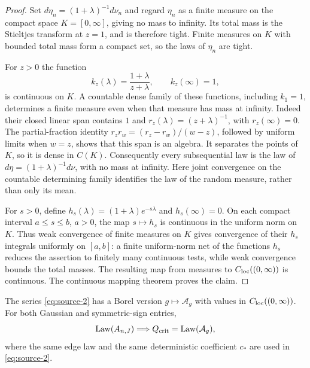 \begin{proof}
Set $d\eta_n=(1+\lambda)^{-1}d\nu_n$ and regard $\eta_n$ as a finite
measure on the compact space $K=[0,\infty]$, giving no mass to infinity.
Its total mass is the Stieltjes transform at $z=1$, and is therefore
tight.  Finite measures on $K$ with bounded total mass form a compact
set, so the laws of $\eta_n$ are tight.

For $z>0$ the function
\[
 k_z(\lambda)=\frac{1+\lambda}{z+\lambda},\qquad k_z(\infty)=1,
\]
is continuous on $K$.  A countable dense family of these functions,
including $k_1=1$, determines a finite measure even when that measure
has mass at infinity.  Indeed their closed linear span contains
$1$ and $r_z(\lambda)=(z+\lambda)^{-1}$, with $r_z(\infty)=0$.
The partial-fraction identity
$r_zr_w=(r_z-r_w)/(w-z)$, followed by uniform limits when $w=z$,
shows that this span is an algebra.  It separates the points of $K$,
so it is dense in $C(K)$.  Consequently every subsequential law is
the law of $d\eta=(1+\lambda)^{-1}d\nu$, with no mass at infinity.
Here joint convergence on the countable determining family identifies
the law of the random measure, rather than only its mean.

For $s>0$, define $h_s(\lambda)=(1+\lambda)e^{-s\lambda}$ and
$h_s(\infty)=0$.  On each compact interval $a\leq s\leq b$, $a>0$,
the map $s\mapsto h_s$ is continuous in the uniform norm on $K$.
Thus weak convergence of finite measures on $K$ gives convergence
of their $h_s$ integrals uniformly on $[a,b]$: a finite uniform-norm
net of the functions $h_s$ reduces the assertion to finitely many
continuous tests, while weak convergence bounds the total masses.
The resulting map from measures to $C_{\rm loc}((0,\infty))$ is
continuous.  The continuous mapping theorem proves the claim.
\end{proof}

\begin{proposition}
\label{prop:functional-identification}
The series \eqref{eq:source-2} has a Borel version
$g\mapsto\mathcal A_g$ with values in $C_{\rm loc}((0,\infty))$.
For both Gaussian and symmetric-sign entries,
\[
 \operatorname{Law}(A_{n,J})\Longrightarrow
 Q_{\rm crit}=\operatorname{Law}(\mathcal A_g),
\]
where the same edge law and the same deterministic coefficient $c_*$
are used in \eqref{eq:source-2}.
\end{proposition}

